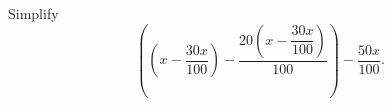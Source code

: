 Simplify
\[
\left(\left(x-\dfrac{30x}{100}\right)-\dfrac{20\left(x-\dfrac{30x}{100}\right)}{100}\right)-\dfrac{50x}{100}.
\]
